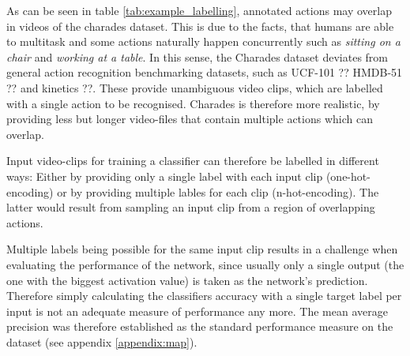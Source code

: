 As can be seen in table \ref{tab:example_labelling}, annotated actions may overlap in videos of the charades dataset.
This is due to the facts, that humans are able to multitask and some actions naturally happen concurrently such as \textit{sitting on a chair} and \textit{working at a table}.
In this sense, the Charades dataset deviates from general action recognition benchmarking datasets, such as UCF-101 ?? HMDB-51 ?? and kinetics ??.
These provide unambiguous video clips, which are labelled with a single action to be recognised.
Charades is therefore more realistic, by providing less but longer video-files that contain multiple actions which can overlap.

Input video-clips for training a classifier can therefore be labelled in different ways: Either by providing only a single label with each input clip (one-hot-encoding) or by providing multiple lables for each clip (n-hot-encoding).
The latter would result from sampling an input clip from a region of overlapping actions. 

Multiple labels being possible for the same input clip results in a challenge when evaluating the performance of the network, since usually only a single output (the one with the biggest activation value) is taken as the network's prediction.
Therefore simply calculating the classifiers accuracy with a single target label per input is not an adequate measure of performance any more.
The mean average precision was therefore established as the standard performance measure on the dataset (see appendix \ref{appendix:map}).
